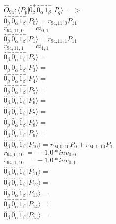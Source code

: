 \documentclass[14pt]{article}
\begin{document}
    $\hat{O}_{94}:  \langle{P_p}\vert \hat{0}_{\beta}^{+}\hat{0}_{\alpha}^{+}\hat{1}_{\beta}^{-} \vert{P_q}\rangle => $ \\ 
    $ \hat{0}_{\beta}^{+}\hat{0}_{\alpha}^{+}\hat{1}_{\beta}^{-} \vert{P_{0}}\rangle = {r}_{94,11,0}P_{11} $ \\ 
    ${r}_{94,11,0}\ =\ {ci}_{0,1} $ \\ 
    $ \hat{0}_{\beta}^{+}\hat{0}_{\alpha}^{+}\hat{1}_{\beta}^{-} \vert{P_{1}}\rangle = {r}_{94,11,1}P_{11} $ \\ 
    ${r}_{94,11,1}\ =\ {ci}_{1,1} $ \\ 
    $ \hat{0}_{\beta}^{+}\hat{0}_{\alpha}^{+}\hat{1}_{\beta}^{-} \vert{P_{2}}\rangle =  $ \\ 
    $ \hat{0}_{\beta}^{+}\hat{0}_{\alpha}^{+}\hat{1}_{\beta}^{-} \vert{P_{3}}\rangle =  $ \\ 
    $ \hat{0}_{\beta}^{+}\hat{0}_{\alpha}^{+}\hat{1}_{\beta}^{-} \vert{P_{4}}\rangle =  $ \\ 
    $ \hat{0}_{\beta}^{+}\hat{0}_{\alpha}^{+}\hat{1}_{\beta}^{-} \vert{P_{5}}\rangle =  $ \\ 
    $ \hat{0}_{\beta}^{+}\hat{0}_{\alpha}^{+}\hat{1}_{\beta}^{-} \vert{P_{6}}\rangle =  $ \\ 
    $ \hat{0}_{\beta}^{+}\hat{0}_{\alpha}^{+}\hat{1}_{\beta}^{-} \vert{P_{7}}\rangle =  $ \\ 
    $ \hat{0}_{\beta}^{+}\hat{0}_{\alpha}^{+}\hat{1}_{\beta}^{-} \vert{P_{8}}\rangle =  $ \\ 
    $ \hat{0}_{\beta}^{+}\hat{0}_{\alpha}^{+}\hat{1}_{\beta}^{-} \vert{P_{9}}\rangle =  $ \\ 
    $ \hat{0}_{\beta}^{+}\hat{0}_{\alpha}^{+}\hat{1}_{\beta}^{-} \vert{P_{10}}\rangle = {r}_{94,0,10}P_{0}+{r}_{94,1,10}P_{1} $ \\ 
    ${r}_{94,0,10}\ =\ -1.0*{inv}_{0,0} $ \\ 
    ${r}_{94,1,10}\ =\ -1.0*{inv}_{0,1} $ \\ 
    $ \hat{0}_{\beta}^{+}\hat{0}_{\alpha}^{+}\hat{1}_{\beta}^{-} \vert{P_{11}}\rangle =  $ \\ 
    $ \hat{0}_{\beta}^{+}\hat{0}_{\alpha}^{+}\hat{1}_{\beta}^{-} \vert{P_{12}}\rangle =  $ \\ 
    $ \hat{0}_{\beta}^{+}\hat{0}_{\alpha}^{+}\hat{1}_{\beta}^{-} \vert{P_{13}}\rangle =  $ \\ 
    $ \hat{0}_{\beta}^{+}\hat{0}_{\alpha}^{+}\hat{1}_{\beta}^{-} \vert{P_{14}}\rangle =  $ \\ 
    $ \hat{0}_{\beta}^{+}\hat{0}_{\alpha}^{+}\hat{1}_{\beta}^{-} \vert{P_{15}}\rangle =  $ \\ 
    
\end{document}
